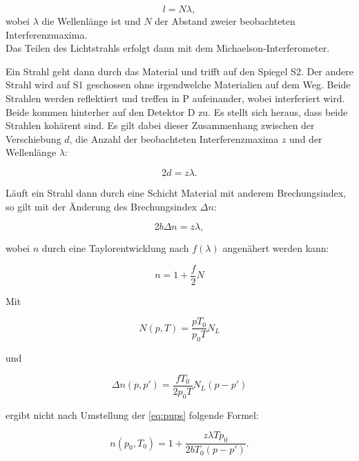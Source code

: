 \begin{equation}
    l = N\lambda,
\end{equation}
wobei \(\lambda\) die Wellenlänge ist und \(N\) der Abstand zweier beobachteten Interferenzmaxima.
\\
Das Teilen des Lichtstrahls erfolgt dann mit dem Michaelson-Interferometer.


Ein Strahl geht dann durch das Material und trifft auf den Spiegel S2. Der andere Strahl wird auf S1 geschossen ohne irgendwelche Materialien auf dem Weg. Beide Strahlen werden reflektiert und treffen in P aufeinander, wobei interferiert wird. Beide kommen hinterher auf den Detektor D zu. Es stellt sich heraus, dass beide Strahlen kohärent sind. Es gilt dabei dieser Zusammenhang zwischen der Verschiebung \(d\), die Anzahl der beobachteten Interferenzmaxima \(z\) und der Wellenlänge \(\lambda\):

\begin{equation}
   2d=z\lambda.
   \label{eq:verschiebung}
\end{equation}

Läuft ein Strahl dann durch eine Schicht Material mit anderem Brechungsindex, so gilt mit der Änderung des Brechungsindex \(\Delta n\):

\begin{equation}
    2b\Delta n = z\lambda,
\end{equation}

wobei \(n\) durch eine Taylorentwicklung nach \(f(\lambda)\) angenähert werden kann:

\begin{equation}
    n = 1+\frac{f}{2} N
    \label{eq:pups}
\end{equation}

Mit 

\begin{equation}
    N(p,T) = \frac{pT_0}{p_0T} N_L
\end{equation}

und 

\begin{equation}
    \Delta n(p,p') = \frac{fT_0}{2p_0T} N_L (p-p')
\end{equation}

ergibt nicht nach Umstellung der \autoref{eq:pups} folgende Formel:

\begin{equation}
    n(p_0,T_0) = 1 + \frac{z\lambda T p_0}{2bT_0 (p-p')}.
    \label{eq:Druck}
\end{equation}